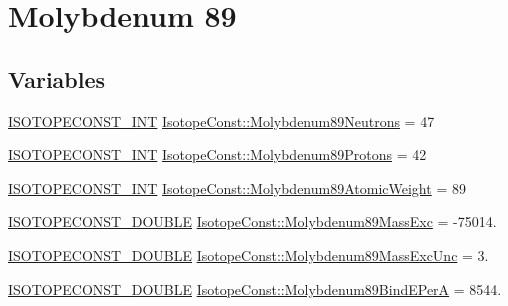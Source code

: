 \hypertarget{group___isotope_const-_molybdenum-_mo89}{}\section{Molybdenum 89}
\label{group___isotope_const-_molybdenum-_mo89}
\subsection*{Variables}
\begin{DoxyCompactItemize}
\item 
\mbox{\hyperlink{group___isotope_const-_macros_ga5f18360b3e99483a35c32d789e62621c}{I\+S\+O\+T\+O\+P\+E\+C\+O\+N\+S\+T\+\_\+\+I\+NT}} \mbox{\hyperlink{group___isotope_const-_molybdenum-_mo89_gaa65a72a802de5a2dac32dbe38bbc1093}{Isotope\+Const\+::\+Molybdenum89\+Neutrons}} = 47
\item 
\mbox{\hyperlink{group___isotope_const-_macros_ga5f18360b3e99483a35c32d789e62621c}{I\+S\+O\+T\+O\+P\+E\+C\+O\+N\+S\+T\+\_\+\+I\+NT}} \mbox{\hyperlink{group___isotope_const-_molybdenum-_mo89_ga7b3197cad45bb55eb36825facf790ca4}{Isotope\+Const\+::\+Molybdenum89\+Protons}} = 42
\item 
\mbox{\hyperlink{group___isotope_const-_macros_ga5f18360b3e99483a35c32d789e62621c}{I\+S\+O\+T\+O\+P\+E\+C\+O\+N\+S\+T\+\_\+\+I\+NT}} \mbox{\hyperlink{group___isotope_const-_molybdenum-_mo89_ga1f9a55eb3914367dbe63d586371829f9}{Isotope\+Const\+::\+Molybdenum89\+Atomic\+Weight}} = 89
\item 
\mbox{\hyperlink{group___isotope_const-_macros_ga8f45a7272ce02c0b4c65c44636ed719a}{I\+S\+O\+T\+O\+P\+E\+C\+O\+N\+S\+T\+\_\+\+D\+O\+U\+B\+LE}} \mbox{\hyperlink{group___isotope_const-_molybdenum-_mo89_gaadfb7c91360f524e59242fb010afc8fd}{Isotope\+Const\+::\+Molybdenum89\+Mass\+Exc}} = -\/75014.
\item 
\mbox{\hyperlink{group___isotope_const-_macros_ga8f45a7272ce02c0b4c65c44636ed719a}{I\+S\+O\+T\+O\+P\+E\+C\+O\+N\+S\+T\+\_\+\+D\+O\+U\+B\+LE}} \mbox{\hyperlink{group___isotope_const-_molybdenum-_mo89_ga641ba3d76104b229cbf427259002d4a4}{Isotope\+Const\+::\+Molybdenum89\+Mass\+Exc\+Unc}} = 3.
\item 
\mbox{\hyperlink{group___isotope_const-_macros_ga8f45a7272ce02c0b4c65c44636ed719a}{I\+S\+O\+T\+O\+P\+E\+C\+O\+N\+S\+T\+\_\+\+D\+O\+U\+B\+LE}} \mbox{\hyperlink{group___isotope_const-_molybdenum-_mo89_ga770a722d4de7454ac3eb5054c43da78d}{Isotope\+Const\+::\+Molybdenum89\+Bind\+E\+PerA}} = 8544.
\item 

\end{DoxyCompactItemize}
